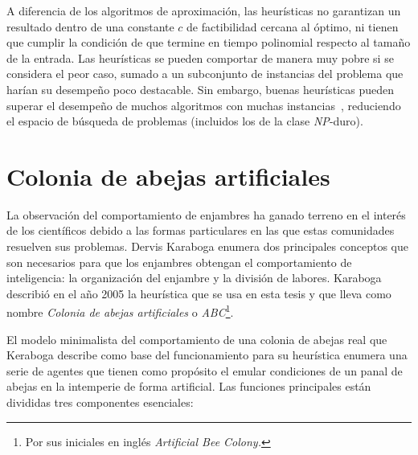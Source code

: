 A diferencia de los algoritmos de aproximación, las heurísticas no garantizan
un resultado dentro de una constante $c$ de factibilidad cercana al óptimo, ni
tienen que cumplir la condición de que termine en tiempo polinomial respecto
al tamaño de la entrada. Las heurísticas se pueden comportar de manera muy
pobre si se considera el peor caso, sumado a un subconjunto de instancias del
problema que harían su desempeño poco destacable. Sin embargo, buenas
heurísticas pueden superar el desempeño de muchos algoritmos con muchas
instancias~\cite{Ausiello:1999:CAC:554706}, reduciendo el espacio de búsqueda
de problemas (incluidos los de la clase \textsl{NP}-duro).

\section{Colonia de abejas artificiales}

La observación del comportamiento de enjambres ha ganado terreno en el interés
de los científicos debido a las formas particulares en las que estas comunidades
resuelven sus problemas. Dervis Karaboga enumera dos principales conceptos que
son necesarios para que los enjambres obtengan el comportamiento de
inteligencia: la organización del enjambre y la división de labores. Karaboga
describió en el año 2005 la heurística que se usa en esta tesis y que lleva como
nombre \textit{Colonia de abejas artificiales} o \textit{ABC}\footnote{Por sus
  iniciales en inglés \textit{Artificial Bee Colony.}}.

El modelo minimalista del comportamiento de una colonia de abejas real
que Keraboga describe como base del funcionamiento para su heurística
enumera una serie de agentes que tienen como propósito el emular condiciones
de un panal de abejas en la intemperie de forma artificial. Las funciones
principales están divididas tres componentes esenciales:

